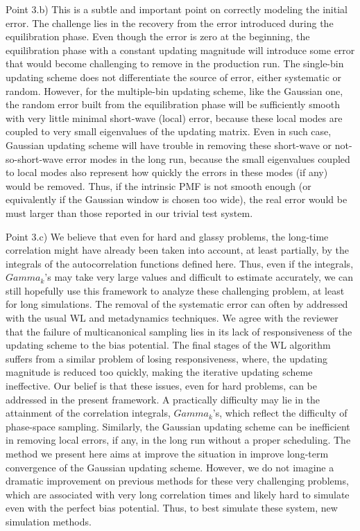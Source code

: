 \documentclass[preprint, superscriptaddress, floatfix]{revtex4-1}
\begin{document}
Point 3.b) This is a subtle and important point on correctly modeling the initial error.
The challenge lies in the recovery from the error introduced during the equilibration phase.
Even though the error is zero at the beginning, the equilibration phase with a constant updating magnitude will introduce some error that would become challenging to remove in the production run.
The single-bin updating scheme does not differentiate the source of error, either systematic or random.
However, for the multiple-bin updating scheme, like the Gaussian one, the random error built from the equilibration phase will be sufficiently smooth with very little minimal short-wave (local) error, because these local modes are coupled to very small eigenvalues of the updating matrix.  Even in such case, Gaussian updating scheme will have trouble in removing these short-wave or not-so-short-wave error modes in the long run, because the small eigenvalues coupled to local modes also represent how quickly the errors in these modes (if any) would be removed.  Thus, if the intrinsic PMF is not smooth enough (or equivalently if the Gaussian window is chosen too wide), the real error would be must larger than those reported in our trivial test system.

Point 3.c)
We believe that even for hard and glassy problems, the long-time correlation might have already been taken into account, at least partially, by the integrals of the autocorrelation functions defined here.
Thus, even if the integrals, $Gamma_k$'s may take very large values and difficult to estimate accurately, we can still hopefully use this framework to analyze these challenging problem, at least for long simulations.
The removal of the systematic error can often by addressed with the usual WL and metadynamics techniques.
We agree with the reviewer that the failure of multicanonical sampling lies in its lack of responsiveness of the updating scheme to the bias potential.
The final stages of the WL algorithm suffers from a similar problem of losing responsiveness, where, the updating magnitude is reduced too quickly, making the iterative updating scheme ineffective.
Our belief is that these issues, even for hard problems, can be addressed in the present framework.
A practically difficulty may lie in the attainment of the correlation integrals, $Gamma_k$'s, which reflect the difficulty of phase-space sampling.
Similarly, the Gaussian updating scheme can be inefficient in removing local errors, if any, in the long run without a proper scheduling.
The method we present here aims at improve the situation in improve long-term convergence of the Gaussian updating scheme. However, we do not imagine a dramatic improvement on previous methods for these very challenging problems, which are associated with very long correlation times and likely hard to simulate even with the perfect bias potential.  Thus, to best simulate these system, new simulation methods.
\end{document}
